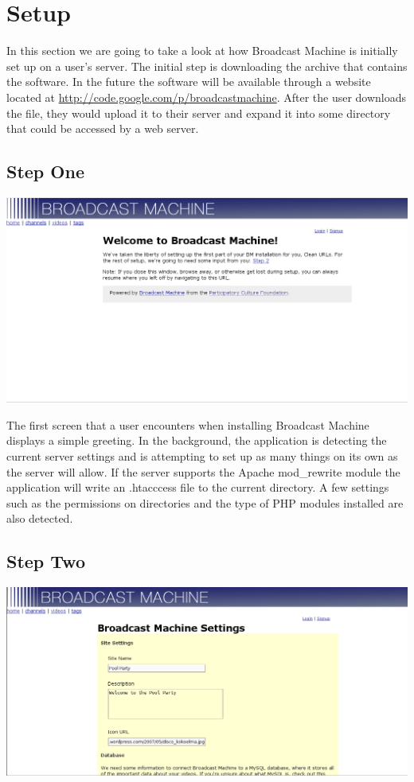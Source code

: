 \documentclass[a4paper,12pt]{report}
\begin{document}
\section{Setup}
In this section we are going to take a look at how Broadcast Machine is initially set up on a user's server.
The initial step is downloading the archive that contains the software.
In the future the software will be available through a website located at \url{http://code.google.com/p/broadcastmachine}.
After the user downloads the file, they would upload it to their server and expand it into some directory that could be accessed by a web server.

\subsection{Step One}
\includegraphics[width=150mm]{images/setup1.png}

The first screen that a user encounters when installing Broadcast Machine displays a simple greeting.
In the background, the application is detecting the current server settings and is attempting to set up as many things on its own as the server will allow.
If the server supports the Apache mod\_rewrite module the application will write an .htacccess file to the current directory.
A few settings such as the permissions on directories and the type of PHP modules installed are also detected.

\subsection{Step Two}
\includegraphics[width=150mm]{images/setup2.png}
\end{document}
